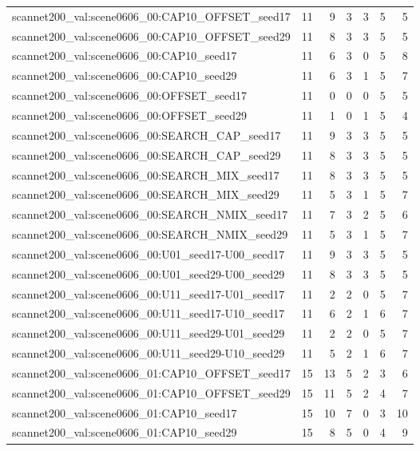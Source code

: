 \begin{table}[t]
\begin{tabular}{lrrrrrr}
scannet200\_val:scene0606\_00:CAP10\_OFFSET\_seed17 & 11 & 9 & 3 & 3 & 5 & 5 \\
scannet200\_val:scene0606\_00:CAP10\_OFFSET\_seed29 & 11 & 8 & 3 & 3 & 5 & 5 \\
scannet200\_val:scene0606\_00:CAP10\_seed17 & 11 & 6 & 3 & 0 & 5 & 8 \\
scannet200\_val:scene0606\_00:CAP10\_seed29 & 11 & 6 & 3 & 1 & 5 & 7 \\
scannet200\_val:scene0606\_00:OFFSET\_seed17 & 11 & 0 & 0 & 0 & 5 & 5 \\
scannet200\_val:scene0606\_00:OFFSET\_seed29 & 11 & 1 & 0 & 1 & 5 & 4 \\
scannet200\_val:scene0606\_00:SEARCH\_CAP\_seed17 & 11 & 9 & 3 & 3 & 5 & 5 \\
scannet200\_val:scene0606\_00:SEARCH\_CAP\_seed29 & 11 & 8 & 3 & 3 & 5 & 5 \\
scannet200\_val:scene0606\_00:SEARCH\_MIX\_seed17 & 11 & 8 & 3 & 3 & 5 & 5 \\
scannet200\_val:scene0606\_00:SEARCH\_MIX\_seed29 & 11 & 5 & 3 & 1 & 5 & 7 \\
scannet200\_val:scene0606\_00:SEARCH\_NMIX\_seed17 & 11 & 7 & 3 & 2 & 5 & 6 \\
scannet200\_val:scene0606\_00:SEARCH\_NMIX\_seed29 & 11 & 5 & 3 & 1 & 5 & 7 \\
scannet200\_val:scene0606\_00:U01\_seed17-U00\_seed17 & 11 & 9 & 3 & 3 & 5 & 5 \\
scannet200\_val:scene0606\_00:U01\_seed29-U00\_seed29 & 11 & 8 & 3 & 3 & 5 & 5 \\
scannet200\_val:scene0606\_00:U11\_seed17-U01\_seed17 & 11 & 2 & 2 & 0 & 5 & 7 \\
scannet200\_val:scene0606\_00:U11\_seed17-U10\_seed17 & 11 & 6 & 2 & 1 & 6 & 7 \\
scannet200\_val:scene0606\_00:U11\_seed29-U01\_seed29 & 11 & 2 & 2 & 0 & 5 & 7 \\
scannet200\_val:scene0606\_00:U11\_seed29-U10\_seed29 & 11 & 5 & 2 & 1 & 6 & 7 \\
scannet200\_val:scene0606\_01:CAP10\_OFFSET\_seed17 & 15 & 13 & 5 & 2 & 3 & 6 \\
scannet200\_val:scene0606\_01:CAP10\_OFFSET\_seed29 & 15 & 11 & 5 & 2 & 4 & 7 \\
scannet200\_val:scene0606\_01:CAP10\_seed17 & 15 & 10 & 7 & 0 & 3 & 10 \\
scannet200\_val:scene0606\_01:CAP10\_seed29 & 15 & 8 & 5 & 0 & 4 & 9 \\

\end{tabular}
\end{table}
